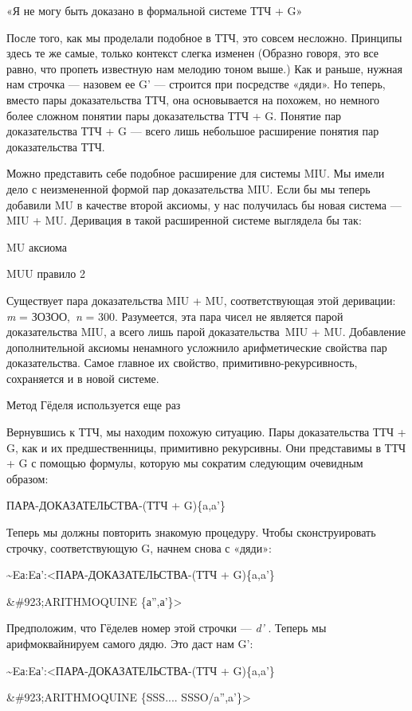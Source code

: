 \documentclass[../main.tex]{subfiles}
\begin{document}
«Я не могу быть доказано в формальной системе ТТЧ + G»

После того, как мы проделали подобное в ТТЧ, это совсем несложно. Принципы здесь те же самые, только контекст слегка изменен (Образно говоря, это все равно, что пропеть известную нам мелодию тоном выше.) Как и раньше, нужная нам строчка --- назовем ее G' --- строится при посредстве «дяди». Но теперь, вместо пары доказательства ТТЧ, она основывается на похожем, но немного более сложном понятии пары доказательства ТТЧ + G. Понятие пар доказательства ТТЧ + G --- всего лишь небольшое расширение понятия пар доказательства ТТЧ.

Можно представить себе подобное расширение для системы MIU. Мы имели дело с неизмененной формой пар доказательства MIU. Если бы мы теперь добавили MU в качестве второй аксиомы, у нас получилась бы новая система --- MIU + MU. Деривация в такой расширенной системе выглядела бы так:

MU аксиома

MUU правило 2

Существует пара доказательства MIU + MU, соответствующая этой деривации: \emph{m} = ЗОЗОО,~\emph{n} = 300. Разумеется, эта пара чисел не является парой доказательства MIU, а всего лишь парой доказательства~MIU + MU. Добавление дополнительной аксиомы ненамного усложнило арифметические свойства пар доказательства. Самое главное их свойство, примитивно-рекурсивность, сохраняется и в новой системе.

Метод Гёделя используется еще раз

Вернувшись к ТТЧ, мы находим похожую ситуацию. Пары доказательства ТТЧ + G, как и их предшественницы, примитивно рекурсивны. Они представимы в ТТЧ + G с помощью формулы, которую мы сократим следующим очевидным образом:

ПАРА-ДОКАЗАТЕЛЬСТВА-(ТТЧ + G)\{a,a'\}

Теперь мы должны повторить знакомую процедуру. Чтобы сконструировать строчку, соответствующую G, начнем снова с «дяди»:

\textasciitilde Eа:Eа':\textless ПАРА-ДОКАЗАТЕЛЬСТВА-(ТТЧ + G)\{a,a'\}

\&\#923;ARITHMOQUINE \{а'',а'\}\textgreater{}

Предположим, что Гёделев номер этой строчки --- \emph{d'} . Теперь мы арифмоквайнируем самого дядю. Это даст нам G':

\textasciitilde Eа:Eа':\textless ПАРА-ДОКАЗАТЕЛЬСТВА-(ТТЧ + G)\{a,a'\}

\&\#923;ARITHMOQUINE \{SSS.... SSSO/a'',a'\}\textgreater{}
\end{document}
